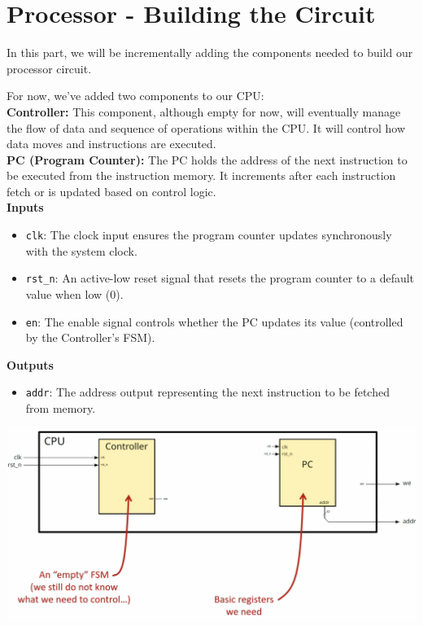 \section{Processor - Building the Circuit}
In this part, we will be incrementally adding the components needed to build our processor circuit.  \\
\vspace*{4px}
\begin{minipage}[htp]{0.45\textwidth}
    For now, we've added two components to our CPU:\\ \vspace*{4px}
        \textbf{Controller:} This component, although empty for now, will eventually manage the flow of data and sequence of operations within the CPU. It will control how data moves and instructions are executed. \\
        \vspace*{4px}
        \textbf{PC (Program Counter):} The PC holds the address of the next instruction to be executed from the instruction memory. It increments after each instruction fetch or is updated based on control logic. \\ \vspace*{5px}
            \textbf{Inputs} 
            \begin{itemize}
                \item \texttt{clk}: The clock input ensures the program counter updates synchronously with the system clock.
                \item \texttt{rst\_n}: An active-low reset signal that resets the program counter to a default value when low (0).
                \item \texttt{en}: The enable signal controls whether the PC updates its value (controlled by the Controller's FSM).
            \end{itemize}
            \textbf{Outputs}
            \begin{itemize}
                \item \texttt{addr}: The address output representing the next instruction to be fetched from memory.
            \end{itemize}
    \end{minipage}
\hfill
\vline
\hfill
\begin{minipage}[htp]{0.45\textwidth}
	\begin{center}
\includegraphics[width=1.2\textwidth]{chapters/chapter2a/images/p1.png}
\end{center}
\end{minipage}

